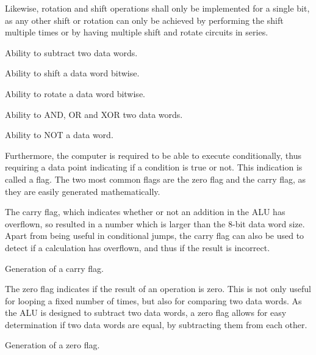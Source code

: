 Likewise, rotation and shift operations shall only be implemented for a single bit, as any other shift or rotation can only be achieved by performing the shift multiple times or by having multiple shift and rotate circuits in series.
\begin{feat-requirement} \label{req:sub}
  Ability to subtract two data words.
\end{feat-requirement}

\begin{feat-requirement}
  Ability to shift a data word bitwise.
\end{feat-requirement}

\begin{feat-requirement}
  Ability to rotate a data word bitwise.
\end{feat-requirement}

\begin{feat-requirement}
  Ability to AND, OR and XOR two data words.
\end{feat-requirement}

\begin{feat-requirement} \label{req:not}
  Ability to NOT a data word.
\end{feat-requirement}

Furthermore, the computer is required to be able to execute conditionally, thus requiring a data point indicating if a condition is true or not. This indication is called a flag. The two most common flags are the zero flag and the carry flag, as they are easily generated mathematically. 

The carry flag, which indicates whether or not an addition in the ALU has overflown, so resulted in a number which is larger than the 8-bit data word size. Apart from being useful in conditional jumps, the carry flag can also be used to detect if a calculation has overflown, and thus if the result is incorrect.

\begin{turing-requirement}
  Generation of a carry flag. 
\end{turing-requirement}

The zero flag indicates if the result of an operation is zero. This is not only useful for looping a fixed number of times, but also for comparing two data words. As the ALU is designed to subtract two data words, a zero flag allows for easy determination if two data words are equal, by subtracting them from each other. 

\begin{feat-requirement}
  Generation of a zero flag.
\end{feat-requirement}

